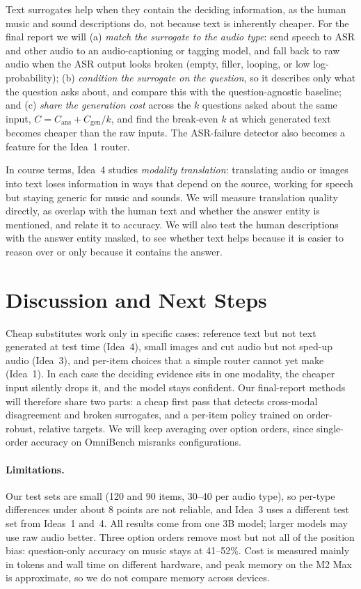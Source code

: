\documentclass{article}
\begin{document}
Text surrogates help when they contain the deciding information, as the human music
and sound descriptions do, not because text is inherently cheaper. For the final
report we will (a) \emph{match the surrogate to the audio type}: send speech to ASR
and other audio to an audio-captioning or tagging model, and fall back to raw audio
when the ASR output looks broken (empty, filler, looping, or low log-probability);
(b) \emph{condition the surrogate on the question}, so it describes only what the
question asks about, and compare this with the question-agnostic baseline; and (c)
\emph{share the generation cost} across the $k$ questions asked about the same input,
$C=C_{\text{ans}}+C_{\text{gen}}/k$, and find the break-even $k$ at which generated
text becomes cheaper than the raw inputs. The ASR-failure detector also becomes a
feature for the Idea~1 router.

In course terms, Idea~4 studies \emph{modality translation}: translating audio or
images into text loses information in ways that depend on the source, working for
speech but staying generic for music and sounds. We will measure translation quality
directly, as overlap with the human text and whether the answer entity is mentioned,
and relate it to accuracy. We will also test the human descriptions with the answer
entity masked, to see whether text helps because it is easier to reason over or only
because it contains the answer.

\section{Discussion and Next Steps}
\label{sec:discussion}

Cheap substitutes work only in specific cases: reference text but not text
generated at test time (Idea~4), small images and cut audio but not sped-up audio
(Idea~3), and per-item choices that a simple router cannot yet make (Idea~1). In
each case the deciding evidence sits in one modality, the cheaper input silently
drops it, and the model stays confident. Our final-report methods will therefore
share two parts: a cheap first pass that detects cross-modal disagreement and broken
surrogates, and a per-item policy trained on order-robust, relative targets. We will
keep averaging over option orders, since single-order accuracy on OmniBench
misranks configurations.

\paragraph{Limitations.} Our test sets are small (120 and 90 items, 30--40 per audio
type), so per-type differences under about 8 points are not reliable, and Idea~3
uses a different test set from Ideas~1 and~4. All results come from one 3B model;
larger models may use raw audio better. Three option orders remove most but not all
of the position bias: question-only accuracy on music stays at 41--52\%. Cost is
measured mainly in tokens and wall time on different hardware, and peak memory on
the M2 Max is approximate, so we do not compare memory across devices.
\end{document}
